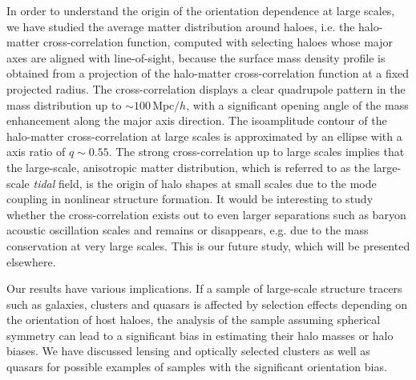 \documentclass[a4paper,fleqn,usenatbib]{mnras}
\newcommand{\Mpc}{\mathrm{Mpc}}
\begin{document}
In order to understand the origin of the orientation dependence at
large scales, we have studied the average matter distribution around haloes,
i.e. the halo-matter cross-correlation function,
computed with selecting haloes whose major axes are
aligned with line-of-sight, because the surface mass density profile is obtained
from a projection of the halo-matter cross-correlation function at a fixed projected radius.
The cross-correlation displays a clear quadrupole pattern in the mass distribution up to
$\sim 100\,\Mpc/h$, with a significant opening angle of the mass enhancement
along the major axis direction.
The isoamplitude contour of the halo-matter cross-correlation
at large scales is approximated by an ellipse with a axis ratio of $q \sim 0.55$.
The strong cross-correlation up to large scales
implies that the large-scale, anisotropic matter distribution,
which is referred to as the large-scale {\it tidal} field, is the origin of
halo shapes at small scales due to the mode coupling in nonlinear structure formation.
It would be interesting to study whether the cross-correlation exists
out to even larger separations such as baryon acoustic oscillation scales
and remains or disappears, e.g. due to the mass conservation at very large scales.
This is our future study, which will be presented elsewhere.

Our results have various implications.
If a sample of large-scale structure tracers such as galaxies, clusters and quasars
is affected by selection effects depending on the orientation of host haloes,
the analysis of the sample assuming spherical symmetry
can lead to a significant bias in estimating their halo masses
or halo biases. We have discussed lensing and optically selected
clusters as well as quasars for possible examples of samples with the
significant orientation bias.
\end{document}

